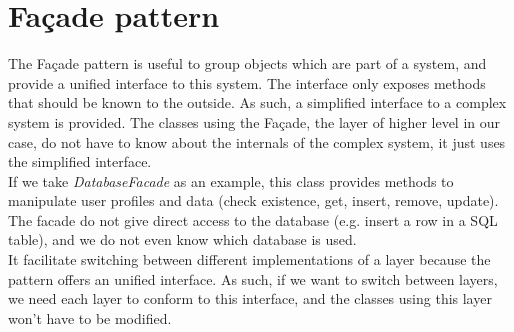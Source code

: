 \section{Façade pattern}
The Façade pattern is useful to group objects which are part of a system, and
provide a unified interface to this system. The interface only exposes methods
that should be known to the outside. As such, a simplified interface to a
complex system is provided. The classes using the Façade, the layer of higher
level in our case, do not have to know about the internals of the complex
system, it just uses the simplified interface.\\

If we take \emph{DatabaseFacade} as an example, this class provides methods
to manipulate user profiles and data (check existence, get, insert, remove,
update). The facade do not give direct access to the database
(e.g. insert a row in a SQL table), and we do not even know which database is
used.\\

It facilitate switching between different implementations of a layer because the
pattern offers an unified interface. As such, if we want to switch between
layers, we need each layer to conform to this interface, and the classes using
this layer won't have to be modified.

\newpage
